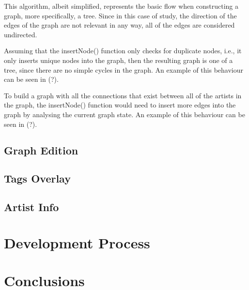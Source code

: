     This algorithm, albeit simplified, represents the basic flow when constructing a graph, more specifically, a tree.
    Since in this case of study, the direction of the edges of the graph are not relevant in any way, all of the edges are considered undirected.

    Assuming that the insertNode() function only checks for duplicate nodes, i.e., it only inserts unique nodes into the graph, then the resulting graph is one of a tree, since there are no simple cycles in the graph.
    An example of this behaviour can be seen in (?).

    To build a graph with all the connections that exist between all of the artists in the graph, the insertNode() function would need to insert more edges into the graph by analysing the current graph state.
    An example of this behaviour can be seen in (?).




  \subsection{Graph Edition} %
    \label{sub:edition}
  


  \subsection{Tags Overlay} %
    \label{sub:tags_overlay}
  



  \subsection{Artist Info} %
    \label{sub:artist_info}
  




\section{Development Process} %
  \label{sec:development_process}

    



\section{Conclusions} %
  \label{sec:conclusions}



